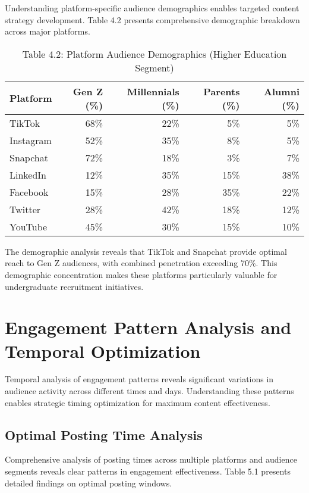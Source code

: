 \documentclass[12pt]{report}
\begin{document}
Understanding platform-specific audience demographics enables targeted content strategy development. Table 4.2 presents comprehensive demographic breakdown across major platforms.

\begin{table}[h]
\centering
\caption{Table 4.2: Platform Audience Demographics (Higher Education Segment)}
\begin{tabular}{@{}lrrrr@{}}
\toprule
\textbf{Platform} & \textbf{Gen Z (\%)} & \textbf{Millennials (\%)} & \textbf{Parents (\%)} & \textbf{Alumni (\%)} \\
\midrule
TikTok & 68\% & 22\% & 5\% & 5\% \\
Instagram & 52\% & 35\% & 8\% & 5\% \\
Snapchat & 72\% & 18\% & 3\% & 7\% \\
LinkedIn & 12\% & 35\% & 15\% & 38\% \\
Facebook & 15\% & 28\% & 35\% & 22\% \\
Twitter & 28\% & 42\% & 18\% & 12\% \\
YouTube & 45\% & 30\% & 15\% & 10\% \\
\bottomrule
\end{tabular}
\end{table}

The demographic analysis reveals that TikTok and Snapchat provide optimal reach to Gen Z audiences, with combined penetration exceeding 70\%. This demographic concentration makes these platforms particularly valuable for undergraduate recruitment initiatives.

\chapter{Engagement Pattern Analysis and Temporal Optimization}

Temporal analysis of engagement patterns reveals significant variations in audience activity across different times and days. Understanding these patterns enables strategic timing optimization for maximum content effectiveness.

\section{Optimal Posting Time Analysis}

Comprehensive analysis of posting times across multiple platforms and audience segments reveals clear patterns in engagement effectiveness. Table 5.1 presents detailed findings on optimal posting windows.
\end{document}
